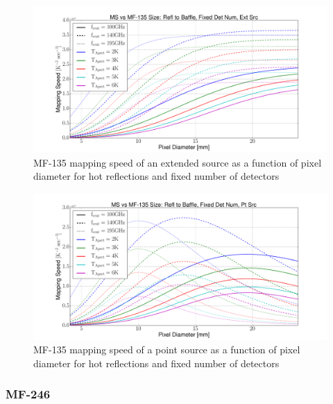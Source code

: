 \documentclass[12pt, titlepage]{article} %
\begin{document}
\begin{figure}[H]
	\centering
	\includegraphics[width=1.1\textwidth, center]{PDF/LFT_MS_MF-135_hotRefl_fixDetNum_extSrc.pdf}
	\caption{MF-135 mapping speed of an extended source as a function of pixel diameter for hot reflections and fixed number of detectors}
\end{figure}

\begin{figure}[H]
	\centering
	\includegraphics[width=1.1\textwidth, center]{PDF/LFT_MS_MF-135_hotRefl_fixDetNum_ptSrc.pdf}
	\caption{MF-135 mapping speed of a point source as a function of pixel diameter for hot reflections and fixed number of detectors}
\end{figure}


\subsubsection{MF-246}
\end{document}
